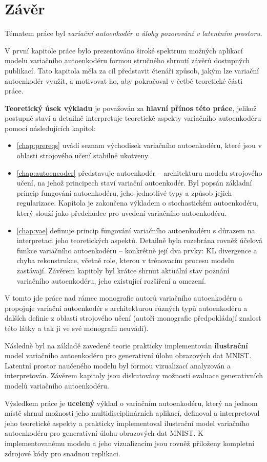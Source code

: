 \chapter*{Závěr}

Tématem práce byl \emph{variační autoenkodér a úlohy pozorování v latentním prostoru}.

V první kapitole práce bylo prezentováno široké spektrum možných aplikací modelu variačního autoenkodéru formou stručného shrnutí závěrů dostupných publikací.
Tato kapitola měla za cíl představit čtenáři způsob, jakým lze variační autoenkodér využít, a motivovat ho, aby pokračoval v četbě teoretické části práce.

\textbf{Teoretický úsek výkladu} je považován za \textbf{hlavní přínos této práce}, jelikož postupně staví a detailně interpretuje teoretické aspekty variačního autoenkodéru pomocí následujících kapitol:
\begin{itemize}
    \item \autoref{chap:prereqs} uvádí seznam východisek variačního autoenkodéru, které jsou v oblasti strojového učení stabilně ukotveny.
    \item \autoref{chap:autoencoder} představuje autoenkodér – architekturu modelu strojového učení, na jehož principech staví variační autoenkodér. Byl popsán základní princip fungování autoenkodéru, jeho jednotlivé typy a způsob jejich regularizace. Kapitola je zakončena výkladem o stochastickém autoenkodéru, který slouží jako předchůdce pro uvedení variačního autoenkodéru. 
    \item \autoref{chap:vae} definuje princip fungování variačního autoenkodéru s důrazem na interpretaci jeho teoretických aspektů. Detailně byla rozebrána rovněž účelová funkce variačního autoenkodéru – konkrétně její dva prvky: KL divergence a chyba rekonstrukce, včetně role, kterou v trénovacím procesu modelu zastávají. Závěrem kapitoly byl krátce shrnut aktuální stav poznání variačního autoenkodéru, jeho existující rozšíření a omezení.
\end{itemize}

V tomto jde práce nad rámec monografie autorů variačního autoenkodéru \textcite{Kingma2019} a propojuje variační autoenkodér s architekturou různých typů autoenkodéru a dalších definic z oblasti strojového učení (autoři monografie předpokládají znalost této látky a tak ji ve své monografii neuvádí).

Následně byl na základě zavedené teorie prakticky implementován \textbf{ilustrační} model variačního autoenkodéru pro generativní úlohu obrazových dat MNIST.
Latentní prostor naučeného modelu byl formou vizualizací analyzován a interpretován. Závěrem kapitoly jsou diskutovány možnosti evaluace generativních modelů variačního autoenkodéru.

Výsledkem práce je \textbf{ucelený} výklad o variačním autoenkodéru, který na jednom místě shrnul možnosti jeho multidisciplinárních aplikací, definoval a interpretoval jeho teoretické aspekty a prakticky implementoval ilustrační model variačního autoenkodéru pro generativní úlohu obrazových dat MNIST.
K implementovanému modelu a jeho vizualizacím jsou rovněž přiloženy kompletní zdrojové kódy pro snadnou replikaci.